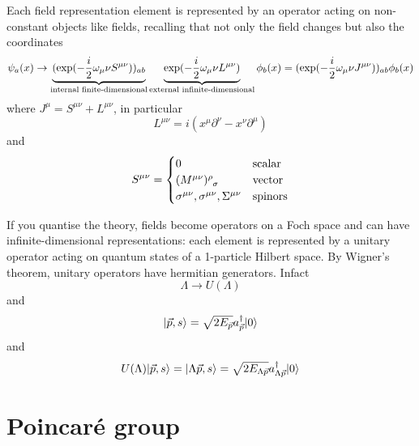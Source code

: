     Each field representation element is represented by an operator acting on non-constant objects like fields, recalling that not only the field changes but also the coordinates 
    \begin{equation*}
        \psi_a(x) \rightarrow \underbrace{(\exp(-\frac{i}{2} \omega_\mu\nu S^{\mu\nu}))_{ab}}_{\textnormal{internal finite-dimensional}} \underbrace{\exp(-\frac{i}{2} \omega_\mu\nu L^{\mu\nu})}_{\textnormal{external infinite-dimensional}} \phi_b(x) = (\exp(-\frac{i}{2} \omega_\mu\nu J^{\mu\nu}))_{ab} \phi_b(x)
    \end{equation*}
    where $J^{\mu} = S^{\mu\nu} + L^{\mu\nu}$, in particular
    \begin{equation*}
        L^{\mu\nu} = i (x^\mu \partial^\nu - x^\nu \partial^\mu)
    \end{equation*}
    and 
    \begin{equation*}
        S^{\mu\nu} = \begin{cases}
            0 & \textnormal{scalar} \\
            (M^{\mu\nu})^\rho_{\phantom \rho \sigma} & \textnormal{vector} \\
            \sigma^{\mu\nu}, \sigma^{\mu\nu}, \Sigma^{\mu\nu} & \textnormal{spinors} \\
        \end{cases}
    \end{equation*}

    If you quantise the theory, fields become operators on a Foch space and can have infinite-dimensional representations: each element is represented by a unitary operator acting on quantum states of a 1-particle Hilbert space. By Wigner's theorem, unitary operators have hermitian generators. Infact
    \begin{equation*}
        \Lambda \rightarrow U(\Lambda)
    \end{equation*}
    and
    \begin{equation*}
        \vert\vec p, s\rangle = \sqrt {2 E_{\vec p}} a^{\dagger}_{\vec p} \vert0\rangle
    \end{equation*}
    and 
    \begin{equation*}
        U(\Lambda) \vert\vec p, s\rangle = \vert\Lambda \vec p, s\rangle = \sqrt {2 E_{\Lambda \vec p}} a^{\dagger}_{\Lambda \vec p} \vert0\rangle
    \end{equation*}

\chapter{Poincaré group}

